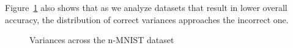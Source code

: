 \documentclass{article}
\begin{document}
Figure~\ref{fig:nmist:vars} also shows that as we analyze datasets that result in lower overall accuracy, the distribution of correct variances approaches the incorrect one. 

\begin{figure}[h!]
\centering
{}

\centering
{}

\centering
{}

\caption{Variances across the n-MNIST dataset}
\label{fig:nmist:vars}
\end{figure}
\end{document}
